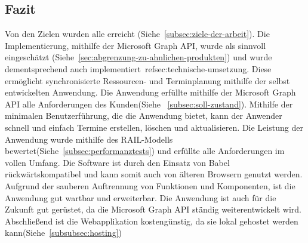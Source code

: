 \subsection{Fazit}\label{subsec:fazit}
%
\newline
\newline
Von den Zielen wurden alle erreicht (Siehe~\ref{subsec:ziele-der-arbeit}).
Die Implementierung, mithilfe der Microsoft Graph API, wurde als sinnvoll eingeschätzt (Siehe~\ref{sec:abgrenzung-zu-ahnlichen-produkten}) und wurde dementsprechend auch implementiert~ref{sec:technische-umsetzung}.
Diese ermöglicht synchronisierte Ressourcen- und Terminplanung mithilfe der selbst entwickelten Anwendung.
Die Anwendung erfüllte mithilfe der Microsoft Graph API alle Anforderungen des Kunden(Siehe ~\ref{subsec:soll-zustand}).
Mithilfe der minimalen Benutzerführung, die die Anwendung bietet, kann der Anwender schnell und einfach Termine erstellen, löschen und aktualisieren.
Die Leistung der Anwendung wurde mithilfe des RAIL-Modells bewertet(Siehe~\ref{subsec:performanztests}) und erfüllte alle Anforderungen im vollen Umfang.
Die Software ist durch den Einsatz von Babel rückwärtskompatibel und kann somit auch von älteren Browsern genutzt werden.
Aufgrund der sauberen Auftrennung von Funktionen und Komponenten, ist die Anwendung gut wartbar und erweiterbar.
Die Anwendung ist auch für die Zukunft gut gerüstet, da die Microsoft Graph API ständig weiterentwickelt wird.
Abschließend ist die Webapplikation kostengünstig, da sie lokal gehostet werden kann(Siehe~\ref{subsubsec:hosting})

